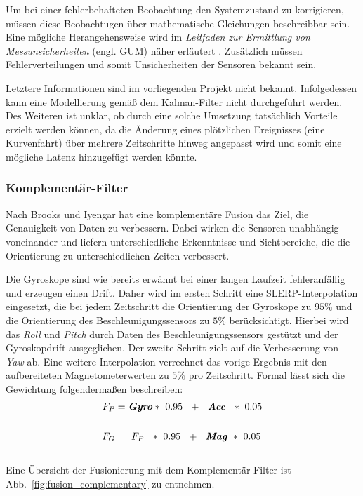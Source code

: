 Um bei einer fehlerbehafteten Beobachtung den Systemzustand zu korrigieren, müssen diese Beobachtugen über mathematische Gleichungen beschreibbar sein. Eine mögliche Herangehensweise wird im \textit{Leitfaden zur Ermittlung von Messunsicherheiten} (engl. \ac{GUM}) näher erläutert \cite{gum1995guide}. Zusätzlich müssen Fehlerverteilungen und somit Unsicherheiten der Sensoren bekannt sein.

Letztere Informationen sind im vorliegenden Projekt nicht bekannt.
Infolgedessen kann eine Modellierung gemäß dem Kalman-Filter nicht durchgeführt werden. 
Des Weiteren ist unklar, ob durch eine solche Umsetzung tatsächlich Vorteile erzielt werden können, da die Änderung eines plötzlichen Ereignisses (\zB eine Kurvenfahrt) über mehrere Zeitschritte hinweg angepasst wird und somit eine mögliche Latenz hinzugefügt werden könnte.

\subsubsection{Komplementär-Filter}
Nach Brooks und Iyengar \cite{Brooks.1998} hat eine komplementäre Fusion das Ziel, die Genauigkeit von Daten zu verbessern. 
Dabei wirken die Sensoren unabhängig voneinander und liefern unterschiedliche Erkenntnisse und Sichtbereiche, die die Orientierung zu unterschiedlichen Zeiten verbessert.

Die Gyroskope sind wie bereits erwähnt bei einer langen Laufzeit fehleranfällig und erzeugen einen Drift. 
Daher wird im ersten Schritt eine \ac{SLERP}-Interpolation eingesetzt, die bei jedem Zeitschritt die Orientierung der Gyroskope zu $95\%$ und die Orientierung des Beschleunigungssensors zu $5\%$ berücksichtigt.
Hierbei wird das \emph{Roll} und \emph{Pitch} durch Daten des Beschleunigungssensors gestützt und der Gyroskopdrift ausgeglichen.
Der zweite Schritt zielt auf die Verbesserung von \emph{Yaw} ab.
Eine weitere Interpolation verrechnet das vorige Ergebnis mit den aufbereiteten Magnetometerwerten zu $5\%$ pro Zeitschritt.
Formal lässt sich die Gewichtung folgendermaßen beschreiben:
\\
\begin{align}
F_P &= \textbf{\textit{Gyro}}*~0.95~~+~~\textbf{\textit{Acc}}~~*~0.05\\
\notag\\
F_G &= ~F_P~~*~0.95~~+~~\textbf{\textit{Mag}}~*~0.05
\end{align}
\\
Eine Übersicht der Fusionierung mit dem Komplementär-Filter ist Abb.~\ref{fig:fusion_complementary} zu entnehmen.

